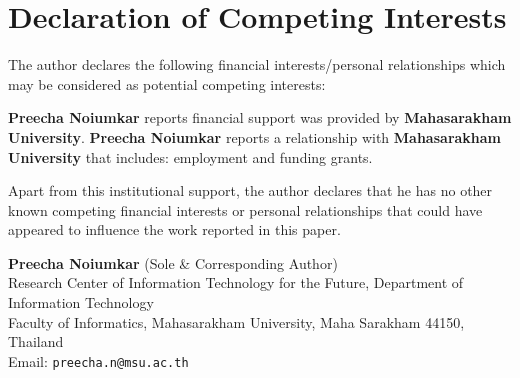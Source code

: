 \documentclass[11pt,a4paper]{article}
\begin{document}
\section*{Declaration of Competing Interests}

The author declares the following financial interests/personal relationships which may be considered as potential competing interests:

\textbf{Preecha Noiumkar} reports financial support was provided by \textbf{Mahasarakham University}. \textbf{Preecha Noiumkar} reports a relationship with \textbf{Mahasarakham University} that includes: employment and funding grants.

Apart from this institutional support, the author declares that he has no other known competing financial interests or personal relationships that could have appeared to influence the work reported in this paper.

\vspace{1.5em}
\noindent
\textbf{Preecha Noiumkar} (Sole \& Corresponding Author)\\
Research Center of Information Technology for the Future, Department of Information Technology\\
Faculty of Informatics, Mahasarakham University, Maha Sarakham 44150, Thailand\\
Email: \texttt{preecha.n@msu.ac.th}
\end{document}
